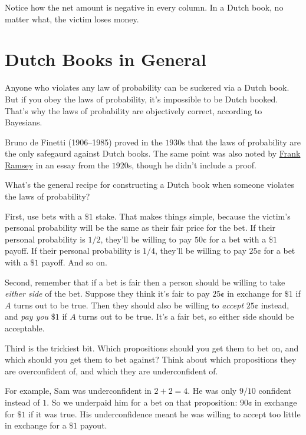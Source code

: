 \documentclass[justified]{tufte-book}
\theoremstyle{definition}
\theoremstyle{definition}
\theoremstyle{definition}
\theoremstyle{definition}
\theoremstyle{remark}
\begin{document}
Notice how the net amount is negative in every column. In a Dutch book, no matter what, the victim loses money.

\hypertarget{dutch-books-in-general}{%
\section{Dutch Books in General}\label{dutch-books-in-general}}

Anyone who violates any law of probability can be suckered via a Dutch book. But if you obey the laws of probability, it's impossible to be Dutch booked. That's why the laws of probability are objectively correct, according to Bayesians.

\begin{marginfigure}
Bruno de Finetti (1906--1985) proved in the \(1930\)s that the laws of
probability are the only safegaurd against Dutch books. The same point
was also noted by \protect\hyperlink{fig:ramsey}{Frank Ramsey} in an
essay from the \(1920\)s, though he didn't include a proof.
\end{marginfigure}

What's the general recipe for constructing a Dutch book when someone violates the laws of probability?

First, use bets with a \(\$1\) stake. That makes things simple, because the victim's personal probability will be the same as their fair price for the bet. If their personal probability is \(1/2\), they'll be willing to pay \(50\)¢ for a bet with a \(\$1\) payoff. If their personal probability is \(1/4\), they'll be willing to pay \(25\)¢ for a bet with a \(\$1\) payoff. And so on.

Second, remember that if a bet is fair then a person should be willing to take \emph{either side} of the bet. Suppose they think it's fair to pay \(25\)¢ in exchange for \(\$1\) if \(A\) turns out to be true. Then they should also be willing to \emph{accept} \(25\)¢ instead, and \emph{pay you} \(\$1\) if \(A\) turns out to be true. It's a fair bet, so either side should be acceptable.

Third is the trickiest bit. Which propositions should you get them to bet on, and which should you get them to bet against? Think about which propositions they are overconfident of, and which they are underconfident of.

For example, Sam was underconfident in \(2+2=4\). He was only \(9/10\) confident instead of \(1\). So we underpaid him for a bet on that proposition: \(90\)¢ in exchange for \(\$1\) if it was true. His underconfidence meant he was willing to accept too little in exchange for a \(\$1\) payout.
\end{document}
